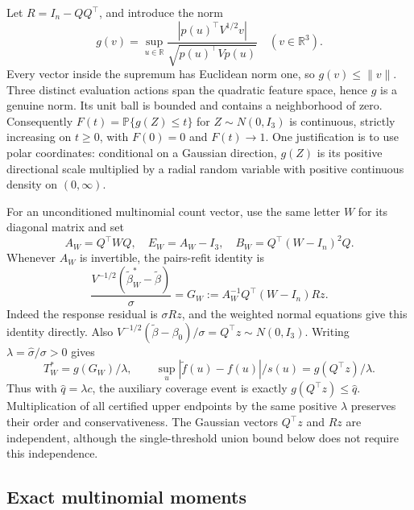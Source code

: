 \documentclass[11pt]{article}
\newcommand{\Prob}{\mathbb P}
\newcommand{\R}{\mathbb R}
\begin{document}
Let $R=I_n-QQ^\top$, and introduce the norm
\[
 g(v)=\sup_{u\in\R}
 \frac{|p(u)^\top V^{1/2}v|}{\sqrt{p(u)^\top Vp(u)}}
 \quad(v\in\R^3).
\]
Every vector inside the supremum has Euclidean norm one, so $g(v)\le\|v\|$.
Three distinct evaluation actions span the quadratic feature space, hence
$g$ is a genuine norm. Its unit ball is bounded and contains a neighborhood
of zero. Consequently $F(t)=\Prob\{g(Z)\le t\}$ for $Z\sim N(0,I_3)$ is
continuous, strictly increasing on $t\ge0$, with $F(0)=0$ and
$F(t)\to1$. One justification is to use polar coordinates: conditional on
a Gaussian direction, $g(Z)$ is its positive directional scale multiplied
by a radial random variable with positive continuous density on $(0,\infty)$.

For an unconditioned multinomial count vector, use the same letter $W$ for
its diagonal matrix and set
\[
 A_W=Q^\top WQ,\quad E_W=A_W-I_3,\quad
 B_W=Q^\top(W-I_n)^2Q.
\]
Whenever $A_W$ is invertible, the pairs-refit identity is
\begin{equation}\label{eq:refit}
 \frac{V^{-1/2}(\widetilde\beta^*_W-\widetilde\beta)}{\sigma}
   =G_W:=A_W^{-1}Q^\top(W-I_n)Rz.
\end{equation}
Indeed the response residual is $\sigma Rz$, and the weighted normal
equations give this identity directly. Also
$V^{-1/2}(\widetilde\beta-\beta_0)/\sigma=Q^\top z\sim N(0,I_3)$.
Writing $\lambda=\widehat\sigma/\sigma>0$ gives
\[
 T_W^*=g(G_W)/\lambda,\qquad
 \sup_u|\widetilde f(u)-f(u)|/s(u)=g(Q^\top z)/\lambda.
\]
Thus with $\widehat q=\lambda c$, the auxiliary coverage event is exactly
$g(Q^\top z)\le\widehat q$. Multiplication of all certified upper endpoints
by the same positive $\lambda$ preserves their order and conservativeness.
The Gaussian vectors $Q^\top z$ and $Rz$ are independent, although the
single-threshold union bound below does not require this independence.

\subsection{Exact multinomial moments}
\end{document}
